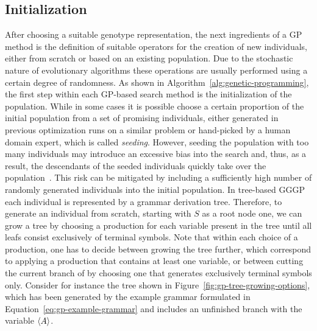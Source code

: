 \subsection{Initialization}
\label{sec:gggp-initialization}
After choosing a suitable genotype representation, the next ingredients of a GP method is the definition of suitable operators for the creation of new individuals, either from scratch or based on an existing population.
Due to the stochastic nature of evolutionary algorithms these operations are usually performed using a certain degree of randomness.
As shown in Algorithm~\ref{alg:genetic-programming}, the first step within each GP-based search method is the initialization of the population. 
While in some cases it is possible choose a certain proportion of the initial population from a set of promising individuals, either generated in previous optimization runs on a similar problem or hand-picked by a human domain expert, which is called \emph{seeding}.
However, seeding the population with too many individuals may introduce an excessive bias into the search and, thus, as a result, the descendants of the seeded individuals quickly take over the population~\cite{poli2008field}.
This risk can be mitigated by including a sufficiently high number of randomly generated individuals into the initial population. 
In tree-based GGGP each individual is represented by a grammar derivation tree.
Therefore, to generate an individual from scratch, starting with $S$ as a root node one, we can grow a tree by choosing a production for each variable present in the tree until all leafs consist exclusively of terminal symbols.
Note that within each choice of a production, one has to decide between growing the tree further, which correspond to applying a production that contains at least one variable, or between cutting the current branch of by choosing one that generates exclusively terminal symbols only.
Consider for instance the tree shown in Figure~\ref{fig:gp-tree-growing-options}, which has been generated by the example grammar formulated in Equation~\eqref{eq:gp-example-grammar} and includes an unfinished branch with the variable $\langle A \rangle$.
